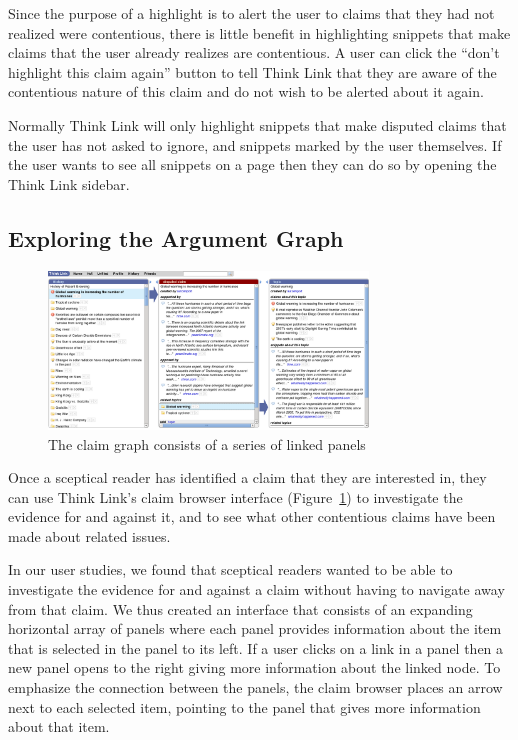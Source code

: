 \documentclass{chi2009}
\newcommand{\todo}[1]{}
\begin{document}
Since the purpose of a highlight is to alert the user to claims that they had not realized were contentious, there is little benefit in highlighting snippets that make claims that the user already realizes are contentious. A user can click the ``don't highlight this claim again'' button to tell Think Link that they are aware of the contentious nature of this claim and do not wish to be alerted about it again.

Normally Think Link will only highlight snippets that make disputed claims that the user has not asked to ignore, and snippets marked by the user themselves. If the user wants to see all snippets on a page then they can do so by opening the Think Link sidebar. 

\todo{ignore button}
\todo{talk about the margin?}
\todo{Talk about snippet and topic previewing}

\subsection{Exploring the Argument Graph}

\begin{figure}[tb]
	\begin{center}
	\includegraphics[width=8.5cm]{../screenshots/v2_panels.png}
	\caption{The claim graph consists of a series of linked panels}
	\label{panels}
	\end{center}
\end{figure}

Once a sceptical reader has identified a claim that they are interested in, they can use Think Link's claim browser interface (Figure~\ref{panels}) to investigate the evidence for and against it, and to see what other contentious claims have been made about related issues. 

In our user studies, we found that sceptical readers wanted to be able to investigate the evidence for and against a claim without having to navigate away from that claim. We thus created an interface that consists of an expanding horizontal array of panels where each panel provides information about the item that is selected in the panel to its left. If a user clicks on a link in a panel then a new panel opens to the right giving more information about the linked node. To emphasize the connection between the panels, the claim browser places an arrow next to each selected item, pointing to the panel that gives more information about that item.
\end{document}
